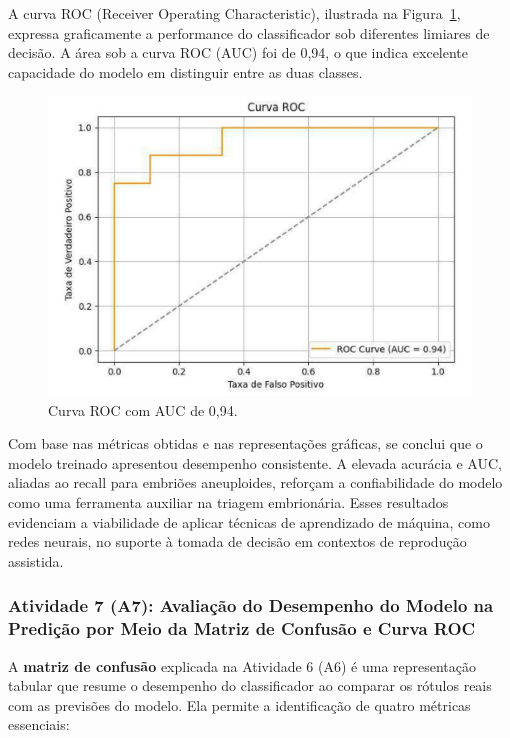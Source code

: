 A curva ROC (Receiver Operating Characteristic), ilustrada na Figura~\ref{fig:curvaRoc}, expressa graficamente a performance do classificador sob diferentes limiares de decisão. A área sob a curva ROC (AUC) foi de 0,94, o que indica excelente capacidade do modelo em distinguir entre as duas classes.

\begin{figure}[h]
    \captionsetup{font=footnotesize, justification=centering, labelsep=period, position=above}
    \label{fig:curvaRoc}
    \centering
    \includegraphics[scale=0.4]{figuras/IA/curvaRoc.pdf}
    \caption{Curva ROC com AUC de 0,94.}
\end{figure}
\FloatBarrier

Com base nas métricas obtidas e nas representações gráficas, se conclui que o modelo treinado apresentou desempenho consistente. A elevada acurácia e AUC, aliadas ao recall para embriões aneuploides, reforçam a confiabilidade do modelo como uma ferramenta auxiliar na triagem embrionária. Esses resultados evidenciam a viabilidade de aplicar técnicas de aprendizado de máquina, como redes neurais, no suporte à tomada de decisão em contextos de reprodução assistida.

\subsubsection{Atividade 7 (A7): Avaliação do Desempenho do Modelo na Predição por Meio da Matriz de Confusão e Curva ROC}
A \textbf{matriz de confusão} explicada na Atividade 6 (A6) é uma representação tabular que resume o desempenho do classificador ao comparar os rótulos reais com as previsões do modelo. Ela permite a identificação de quatro métricas essenciais:

